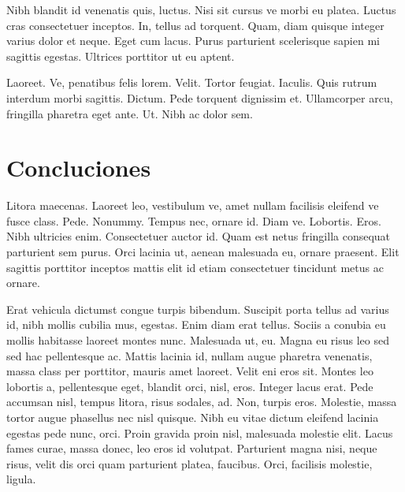 \documentclass[a5paper,10pt,twocolumn,twoside]{book}
\begin{document}
Nibh blandit id venenatis quis, luctus. Nisi sit cursus ve morbi eu platea. Luctus cras consectetuer inceptos. In, tellus ad torquent. Quam, diam quisque integer varius dolor et neque. Eget cum lacus. Purus parturient scelerisque sapien mi sagittis egestas. Ultrices porttitor ut eu aptent.

Laoreet. Ve, penatibus felis lorem. Velit. Tortor feugiat. Iaculis. Quis rutrum interdum morbi sagittis. Dictum. Pede torquent dignissim et. Ullamcorper arcu, fringilla pharetra eget ante. Ut. Nibh ac dolor sem.
\chapter{Concluciones}
Litora maecenas. Laoreet leo, vestibulum ve, amet nullam facilisis eleifend ve fusce class. Pede. Nonummy. Tempus nec, ornare id. Diam ve. Lobortis. Eros. Nibh ultricies enim. Consectetuer auctor id. Quam est netus fringilla consequat parturient sem purus. Orci lacinia ut, aenean malesuada eu, ornare praesent. Elit sagittis porttitor inceptos mattis elit id etiam consectetuer tincidunt metus ac ornare.

Erat vehicula dictumst congue turpis bibendum. Suscipit porta tellus ad varius id, nibh mollis cubilia mus, egestas. Enim diam erat tellus. Sociis a conubia eu mollis habitasse laoreet montes nunc. Malesuada ut, eu. Magna eu risus leo sed sed hac pellentesque ac. Mattis lacinia id, nullam augue pharetra venenatis, massa class per porttitor, mauris amet laoreet. Velit eni eros sit. Montes leo lobortis a, pellentesque eget, blandit orci, nisl, eros. Integer lacus erat. Pede accumsan nisl, tempus litora, risus sodales, ad. Non, turpis eros. Molestie, massa tortor augue phasellus nec nisl quisque. Nibh eu vitae dictum eleifend lacinia egestas pede nunc, orci. Proin gravida proin nisl, malesuada molestie elit. Lacus fames curae, massa donec, leo eros id volutpat. Parturient magna nisi, neque risus, velit dis orci quam parturient platea, faucibus. Orci, facilisis molestie, ligula.
\end{document}

